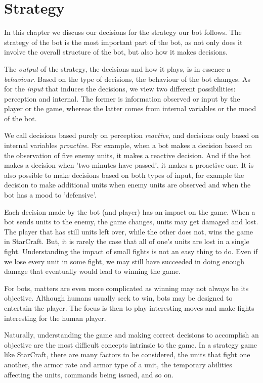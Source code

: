 
\chapter{Strategy}
\label{chap:strategy}

In this chapter we discuss our decisions for the strategy our bot follows. The strategy of the bot is the most important part of the bot, as not only does it involve the overall structure of the bot, but also how it makes decisions.

The \emph{output} of the strategy, the decisions and how it plays, is in essence a \emph{behaviour}. Based on the type of decisions, the behaviour of the bot changes. As for the \emph{input} that induces the decisions, we view two different possibilities: perception and internal. The former is information observed or input by the player or the game, whereas the latter comes from internal variables or the mood of the bot.

We call decisions based purely on perception \emph{reactive}, and decisions only based on internal variables \emph{proactive}. For example, when a bot makes a decision based on the observation of five enemy units, it makes a reactive decision. And if the bot makes a decision when 'two minutes have passed', it makes a proactive one. It is also possible to make decisions based on both types of input, for example the decision to make additional units when enemy units are observed and when the bot has a mood to 'defensive'.

Each decision made by the bot (and player) has an impact on the game. When a bot sends units to the enemy, the game changes, units may get damaged and lost. The player that has still units left over, while the other does not, wins the game in StarCraft. But, it is rarely the case that all of one's units are lost in a single fight. Understanding the impact of small fights is not an easy thing to do. Even if we lose every unit in some fight, we may still have succeeded in doing enough damage that eventually would lead to winning the game.

For bots, matters are even more complicated as winning may not always be its objective. Although humans usually seek to win, bots may be designed to entertain the player. The focus is then to play interesting moves and make fights interesting for the human player.


Naturally, understanding the game and making correct decisions to accomplish an objective are the most difficult concepts intrinsic to the game. In a strategy game like StarCraft, there are many factors to be considered, the units that fight one another, the armor rate and armor type of a unit, the temporary abilities affecting the units, commands being issued, and so on. 

